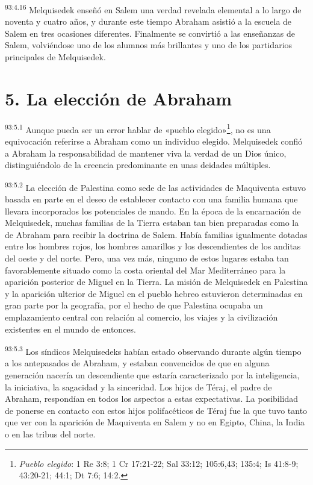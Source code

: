 \par
\textsuperscript{93:4.16} Melquisedek enseñó en Salem una verdad revelada elemental a lo largo de noventa y cuatro años, y durante este tiempo Abraham asistió a la escuela de Salem en tres ocasiones diferentes. Finalmente se convirtió a las enseñanzas de Salem, volviéndose uno de los alumnos más brillantes y uno de los partidarios principales de Melquisedek.

\section*{5. La elección de Abraham}
\par
\textsuperscript{93:5.1} Aunque pueda ser un error hablar de «pueblo elegido»\footnote{\textit{Pueblo elegido}: 1 Re 3:8; 1 Cr 17:21-22; Sal 33:12; 105:6,43; 135:4; Is 41:8-9; 43:20-21; 44:1; Dt 7:6; 14:2.}, no es una equivocación referirse a Abraham como un individuo elegido. Melquisedek confió a Abraham la responsabilidad de mantener viva la verdad de un Dios único, distinguiéndolo de la creencia predominante en unas deidades múltiples.

\par
\textsuperscript{93:5.2} La elección de Palestina como sede de las actividades de Maquiventa estuvo basada en parte en el deseo de establecer contacto con una familia humana que llevara incorporados los potenciales de mando. En la época de la encarnación de Melquisedek, muchas familias de la Tierra estaban tan bien preparadas como la de Abraham para recibir la doctrina de Salem. Había familias igualmente dotadas entre los hombres rojos, los hombres amarillos y los descendientes de los anditas del oeste y del norte. Pero, una vez más, ninguno de estos lugares estaba tan favorablemente situado como la costa oriental del Mar Mediterráneo para la aparición posterior de Miguel en la Tierra. La misión de Melquisedek en Palestina y la aparición ulterior de Miguel en el pueblo hebreo estuvieron determinadas en gran parte por la geografía, por el hecho de que Palestina ocupaba un emplazamiento central con relación al comercio, los viajes y la civilización existentes en el mundo de entonces.

\par
\textsuperscript{93:5.3} Los síndicos Melquisedeks habían estado observando durante algún tiempo a los antepasados de Abraham, y estaban convencidos de que en alguna generación nacería un descendiente que estaría caracterizado por la inteligencia, la iniciativa, la sagacidad y la sinceridad. Los hijos de Téraj, el padre de Abraham, respondían en todos los aspectos a estas expectativas. La posibilidad de ponerse en contacto con estos hijos polifacéticos de Téraj fue la que tuvo tanto que ver con la aparición de Maquiventa en Salem y no en Egipto, China, la India o en las tribus del norte.

